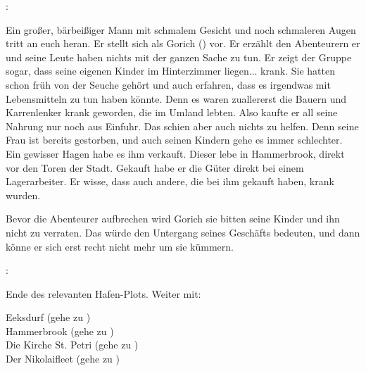 :

Ein großer, bärbeißiger Mann mit schmalem Gesicht und noch schmaleren Augen tritt an euch heran. Er stellt sich als Gorich (\blue{\ref{Gorich}}) vor. Er erzählt den Abenteurern er und seine Leute haben nichts mit der ganzen Sache zu tun. Er zeigt der Gruppe sogar, dass seine eigenen Kinder im Hinterzimmer liegen... krank. Sie hatten schon früh von der Seuche gehört und auch erfahren, dass es irgendwas mit Lebensmitteln zu tun haben könnte. Denn es waren zuallererst die Bauern und Karrenlenker krank geworden, die im Umland lebten. Also kaufte er all seine Nahrung nur noch aus Einfuhr. Das schien aber auch nichts zu helfen. Denn seine Frau ist bereits gestorben, und auch seinen Kindern gehe es immer schlechter. Ein gewisser Hagen habe es ihm verkauft. Dieser lebe in Hammerbrook, direkt vor den Toren der Stadt. Gekauft habe er die Güter direkt bei einem Lagerarbeiter. Er wisse, dass auch andere, die bei ihm gekauft haben, krank wurden.

Bevor die Abenteurer aufbrechen wird Gorich sie bitten seine Kinder und ihn nicht zu verraten. Das würde den Untergang seines Geschäfts bedeuten, und dann könne er sich erst recht nicht mehr um sie kümmern.

:




Ende des relevanten Hafen-Plots. Weiter mit:

Eeksdurf (gehe zu \blue{\ref{xd}}) \\
Hammerbrook (gehe zu \blue{\ref{Hammerbrook}}) \\
Die Kirche St. Petri (gehe zu \blue{\ref{Petri}}) \\
Der Nikolaifleet (gehe zu \blue{\ref{Fleet}}) \\
